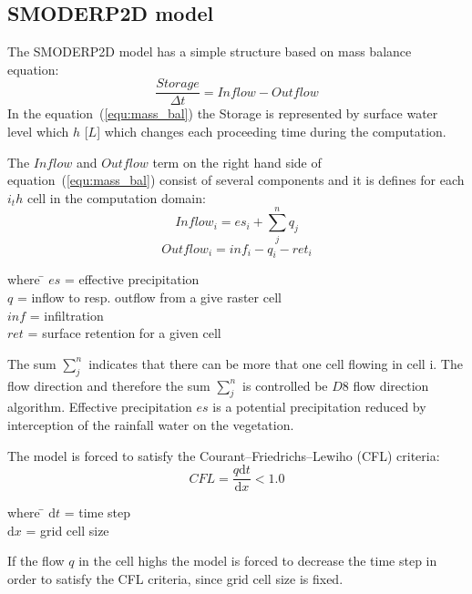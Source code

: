 \subsection{SMODERP2D model}
The SMODERP2D model has a simple structure based on mass balance equation:
\begin{equation}\label{equ:mass_bal}
    \frac{Storage}{\Delta t} = \nonumber  
    Inflow - Outflow
\end{equation}
In the equation~(\ref{equ:mass_bal}) the Storage is represented by surface water level which $h$ [$L$] which changes each proceeding time during the computation. 

The $Inflow$ and $Outflow$ term on the right hand side of equation~(\ref{equ:mass_bal}) consist of several components and it is defines for each $i_th$ cell in the computation domain:
\begin{equation}\label{equ:inflow}
    Inflow_i = es_{i} + \sum_j^n q_{j}
\end{equation}
\begin{equation}\label{equ:outflow}
    Outflow_i = inf_{i} - q_{i} - ret_i
\end{equation}
\begin{tabbing} 
where \hspace{0.6cm} \= $es$ = effective precipitation\\
\> $q$ = inflow to resp. outflow from a give raster cell\\
\> $inf$ = infiltration\\
\> $ret$ = surface retention for a given cell
\end{tabbing}
The sum $\sum_j^n$ indicates that there can be more that one cell flowing in cell i. The flow direction and therefore the sum $\sum_j^n$ is controlled be $D8$ flow direction algorithm. 
Effective precipitation $es$ is a potential precipitation reduced by interception of the rainfall water on the vegetation. 

The model is forced to satisfy the Courant–Friedrichs–Lewiho (CFL) criteria:
\begin{equation}\label{equ:CFL}
    CFL = \frac{q\textrm{d}t}{\textrm{d}x} < 1.0
\end{equation}
\begin{tabbing} 
where \hspace{0.6cm} \= $\textrm{d}t$ = time step\\
\> $\textrm{d}x$ = grid cell size
\end{tabbing}
If the flow $q$ in the cell highs the model is forced to decrease the time step in order to satisfy the CFL criteria, since grid cell size is fixed. 

